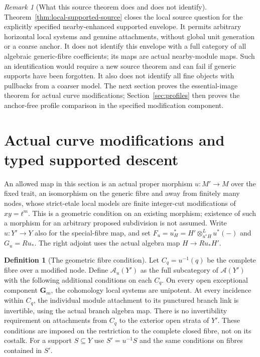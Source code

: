 \documentclass[11pt]{article}
\theoremstyle{definition}
\newtheorem{definition}[theorem]{Definition}
\theoremstyle{remark}
\newtheorem{remark}[theorem]{Remark}
\begin{document}
\begin{remark}[What this source theorem does and does not identify]
Theorem~\ref{thm:local-supported-source} closes the local source
question for the explicitly specified nearby-enhanced supported
envelope.  It permits arbitrary horizontal local systems and genuine
attachments, without global unit generation or a coarse anchor.
It does not identify this envelope with a full category of all
algebraic generic-fibre coefficients; its maps are actual
nearby-module maps.  Such an identification would require a new
source theorem and can fail if generic supports have been forgotten.
It also does not identify all fine objects with pullbacks from a
coarser model.  The next section proves the essential-image theorem for actual
curve modifications; Section~\ref{sec:profiles} then proves the
anchor-free profile comparison in the specified modification component.
\end{remark}

\section{Actual curve modifications and typed supported descent}
\label{sec:curve-modification}
An allowed map in this section is an actual proper morphism
$u:M'\to M$ over the fixed trait, an isomorphism on the generic fibre
and away from finitely many nodes, whose strict-etale local models
are finite integer-cut modifications of $xy=t^m$.
This is a geometric condition on an existing morphism; existence of
such a morphism for an arbitrary proposed subdivision is not assumed.
Write $u:Y'\to Y$ also for the special-fibre map, and set
$F_u=u_H^*=H'\otimes^L_{u^*H}u^*(-)$ and $G_u=Ru_*$.
The right adjoint uses the actual algebra map $H\to Ru_*H'$.

\begin{definition}[The geometric fibre condition]
\label{def:fibre-condition}
Let $C_q=u^{-1}(q)$ be the complete fibre over a modified node.
Define $\mathcal A_u(Y')$ as the full subcategory of
$\mathcal A(Y')$ with the following additional conditions on each
$C_q$.  On every open exceptional component $\mathbf G_m$, the
cohomology local systems are unipotent.  At every incidence within
$C_q$, the individual module attachment to its punctured branch
link is invertible, using the actual branch algebra map.
There is no invertibility requirement on attachments from $C_q$
to the exterior open strata of $Y'$.  These conditions are imposed
on the restriction to the complete closed fibre, not on its costalk.
For a support $S\subseteq Y$ use $S'=u^{-1}S$ and the same conditions
on fibres contained in $S'$.
\end{definition}
\end{document}
